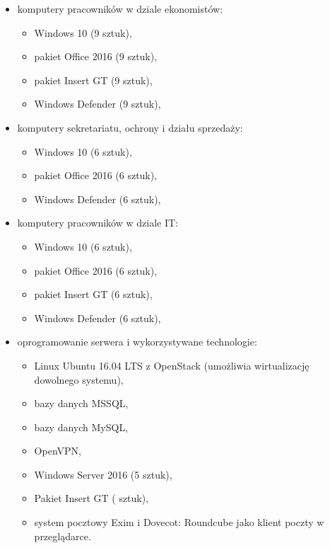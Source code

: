 \hspace{-0.5cm}\begin{minipage}{13.5cm}
\begin{itemize}
	\item komputery pracowników w dziale ekonomistów:
	\begin{itemize}
		\item Windows 10 (9 sztuk),
		\item pakiet Office 2016 (9 sztuk),
		\item pakiet Insert GT (9 sztuk),
		\item Windows Defender (9 sztuk),
	\end{itemize}
	\item komputery sekretariatu, ochrony i działu sprzedaży:
	\begin{itemize}
		\item Windows 10 (6 sztuk),
		\item pakiet Office 2016 (6 sztuk),
		\item Windows Defender (6 sztuk),
	\end{itemize}
	\item komputery pracowników w dziale IT:
	\begin{itemize}
		\item Windows 10 (6 sztuk),
		\item pakiet Office 2016 (6 sztuk),
		\item pakiet Insert GT (6 sztuk),
		\item Windows Defender (6 sztuk),
	\end{itemize}
	\item oprogramowanie serwera i wykorzystywane technologie:
	\begin{itemize}
		\item Linux Ubuntu 16.04 LTS z OpenStack (umożliwia wirtualizację
		\linebreak dowolnego systemu),
		\item bazy danych MSSQL,
		\item bazy danych MySQL,
		\item OpenVPN,
		\item Windows Server 2016 (5 sztuk),
		\item Pakiet Insert GT ( sztuk),
		\item system pocztowy Exim i Dovecot: Roundcube jako klient poczty \linebreak w przeglądarce.
	\end{itemize}
\end{itemize}
\end{minipage}

